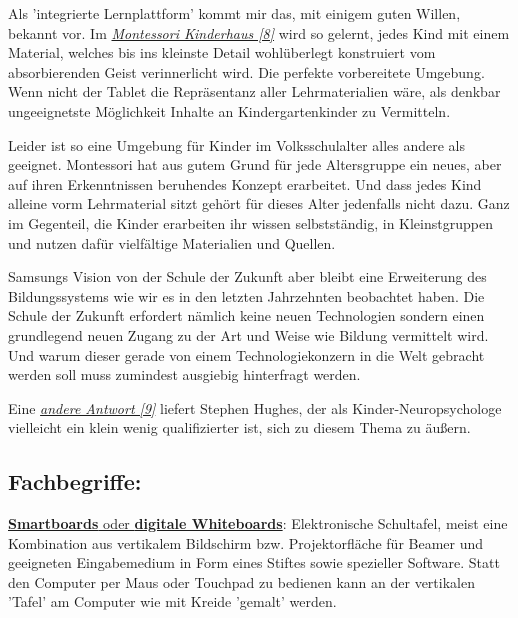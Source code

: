 Als 'integrierte Lernplattform' kommt mir das, mit einigem guten Willen, bekannt vor. Im \href{http://www.montessori-kindergarten.at/}{\textit{Montessori Kinderhaus [8]}} wird so gelernt, jedes Kind mit einem Material, welches bis ins kleinste Detail wohlüberlegt konstruiert vom absorbierenden Geist verinnerlicht wird. Die perfekte vorbereitete Umgebung. Wenn nicht der Tablet die Repräsentanz aller Lehrmaterialien wäre, als denkbar ungeeignetste Möglichkeit Inhalte an Kindergartenkinder zu Vermitteln.

Leider ist so eine Umgebung für Kinder im Volksschulalter alles andere als geeignet. Montessori hat aus gutem Grund für jede Altersgruppe ein neues, aber auf ihren Erkenntnissen beruhendes Konzept erarbeitet. Und dass jedes Kind alleine vorm Lehrmaterial sitzt gehört für dieses Alter jedenfalls nicht dazu. Ganz im Gegenteil, die Kinder erarbeiten ihr wissen selbstständig, in Kleinstgruppen und nutzen dafür vielfältige Materialien und Quellen.

Samsungs Vision von der Schule der Zukunft aber bleibt eine Erweiterung des Bildungssystems wie wir es in den letzten Jahrzehnten beobachtet haben. Die Schule der Zukunft erfordert nämlich keine neuen Technologien sondern einen grundlegend neuen Zugang zu der Art und Weise wie Bildung vermittelt wird. Und warum dieser gerade von einem Technologiekonzern in die Welt gebracht werden soll muss zumindest ausgiebig hinterfragt werden.

Eine \href{https://vimeo.com/40791188}{\textit{andere Antwort [9]}} 
liefert Stephen Hughes, der als Kinder-Neuropsychologe vielleicht ein klein wenig qualifizierter ist, sich zu diesem Thema zu äußern.
\subsection*{Fachbegriffe:}
\href{https://de.wikipedia.org/wiki/Smartboard#Digitale_Whiteboards}{\textbf{Smartboards} oder \textbf{digitale Whiteboards}}: Elektronische Schultafel, meist eine Kombination aus vertikalem Bildschirm bzw. Projektorfläche für Beamer und geeigneten Eingabemedium in Form eines Stiftes sowie spezieller Software. Statt den Computer per Maus oder Touchpad zu bedienen kann an der vertikalen 'Tafel' am Computer wie mit Kreide 'gemalt' werden.

